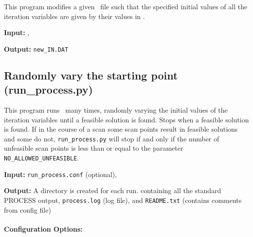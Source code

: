This program modifies a given \indat\ file such that the specified initial values of all the iteration variables are given by their values in \outdat. 

\begin{description}
\item{\textbf{Input:}}
\indat, \outdat\ 
                                
\item{\textbf{Output:}}
\texttt{new\_IN.DAT}
\end{description}

\subsection{Randomly vary the starting point (run\_process.py)}
\label{subsec:run_process}
This program runs \process\ many times, randomly varying the initial values of the iteration variables until a feasible solution is found.  Stops when a feasible solution is found.  If in the course of a scan some scan points result in feasible solutions and some do not, \texttt{run\_process.py} will stop if and only if the number of unfeasible scan points is less than or equal to the parameter \texttt{NO\_ALLOWED\_UNFEASIBLE}.

\begin{description}
\item{\textbf{Input:}}
\texttt{run\_process.conf} (optional), \indat\
                                
\item{\textbf{Output:}} A directory is created for each run. containing all the standard
  PROCESS output, \texttt{process.log} (log file), and \texttt{README.txt}
  (contains comments from config file)
\end{description}

\paragraph{Configuration Options:}

